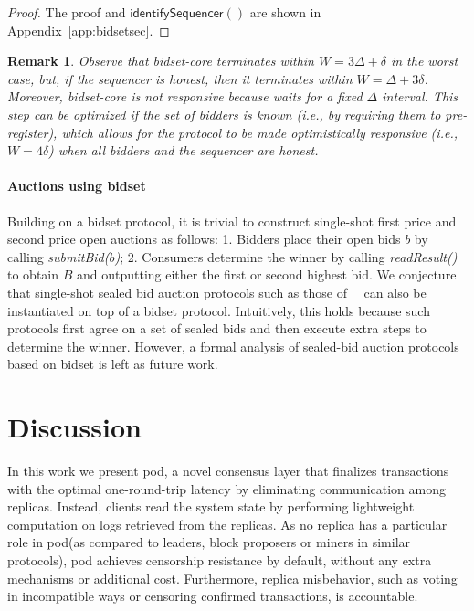 \documentclass[pdflatex,sn-mathphys-num]{sn-jnl}%
\theoremstyle{thmstyleone}%
\theoremstyle{thmstyletwo}%
\newtheorem{remark}{Remark}%
\theoremstyle{thmstylethree}%
\newcommand{\podtm}{\textsf{pod}\xspace}
\newcommand{\bidsettm}{\textsf{bidset}\xspace}
\newcommand{\op}[1]{\textsl{#1}}
\newcommand{\identifySequencer}[1]{\ensuremath{\mathsf{identifySequencer}(#1)}\xspace}
\newcommand{\parAuctionTerm}{\ensuremath{W}\xspace}
\newcommand{\dotparagraph}[1]{\paragraph*{#1}}
\newcommand{\bag}{\ensuremath{B}\xspace}
\newcommand{\opSubmitBid}[1]{\op{submitBid(#1)}\xspace}
\newcommand{\opReadResult}[1]{\op{readResult(#1)}\xspace}
\newcommand{\bid}{\ensuremath{b}\xspace}
\begin{document}
\begin{proof} The proof and \identifySequencer{} are shown in Appendix~\ref{app:bidsetsec}.
\end{proof}

\begin{remark}
    Observe that \bidsettm-core terminates within $\parAuctionTerm = 3\Delta + \delta$ in the worst case, but, if the sequencer is honest, then it terminates within $\parAuctionTerm = \Delta + 3\delta$.
    Moreover, \bidsettm-core is not responsive because  waits for a fixed $\Delta$ interval.
    This step can be optimized if the set of bidders is known (i.e., by requiring them to pre-register), which allows for the protocol to be made optimistically responsive (\textit{i.e.}, $\parAuctionTerm = 4\delta$) when all bidders and the sequencer are honest.
\end{remark}

\dotparagraph{\textbf{Auctions using \bidsettm}} Building on a \bidsettm protocol, it is trivial to construct single-shot first price and second price open auctions as follows: 1. Bidders place their open bids $\bid$ by calling \opSubmitBid{\bid}; 2. Consumers determine the winner by calling \opReadResult{} to obtain $\bag$ and outputting either the first or second highest bid. We conjecture that single-shot sealed bid auction protocols such as those of~~\cite{trustee,seal,ACNS:DavGenPou22,CCS:TAFWBM23,chitra_et_al:LIPIcs.AFT.2024.19,cryptoeprint:2024/1011} can also be instantiated on top of a \bidsettm protocol. Intuitively, this holds because such protocols first agree on a set of sealed bids and then execute extra steps to determine the winner. However, a formal analysis of sealed-bid auction protocols based on \bidsettm is left as future work.


\section{Discussion}
In this work we present \podtm, a novel consensus layer that finalizes transactions with the optimal one-round-trip latency by eliminating communication among replicas. Instead, clients read the system state by performing lightweight computation on logs retrieved from the replicas. As no replica has a particular role in \podtm (as compared to leaders, block proposers or miners in similar protocols), \podtm achieves censorship resistance by default, without any extra mechanisms or additional cost. Furthermore, replica misbehavior, such as voting in incompatible ways or censoring confirmed transactions, is accountable.
\end{document}
